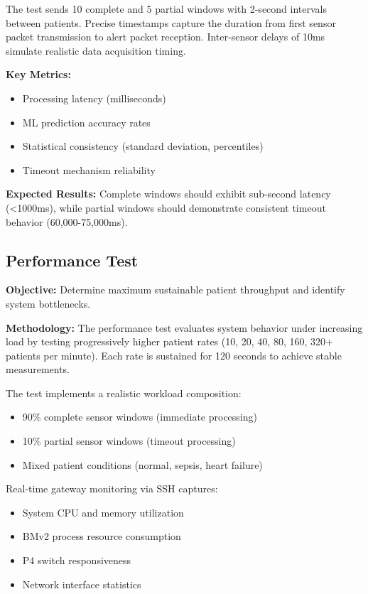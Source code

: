 The test sends 10 complete and 5 partial windows with 2-second intervals between patients. Precise timestamps capture the duration from first sensor packet transmission to alert packet reception. Inter-sensor delays of 10ms simulate realistic data acquisition timing.

\textbf{Key Metrics:}
\begin{itemize}
    \item Processing latency (milliseconds)
    \item ML prediction accuracy rates
    \item Statistical consistency (standard deviation, percentiles)
    \item Timeout mechanism reliability
\end{itemize}

\textbf{Expected Results:} Complete windows should exhibit sub-second latency (\textless 1000ms), while partial windows should demonstrate consistent timeout behavior (60,000-75,000ms).

\subsection{Performance Test}
\label{subsec:performance-test}

\textbf{Objective:} Determine maximum sustainable patient throughput and identify system bottlenecks.

\textbf{Methodology:} The performance test evaluates system behavior under increasing load by testing progressively higher patient rates (10, 20, 40, 80, 160, 320+ patients per minute). Each rate is sustained for 120 seconds to achieve stable measurements.

The test implements a realistic workload composition:
\begin{itemize}
    \item 90\% complete sensor windows (immediate processing)
    \item 10\% partial sensor windows (timeout processing)
    \item Mixed patient conditions (normal, sepsis, heart failure)
\end{itemize}

Real-time gateway monitoring via SSH captures:
\begin{itemize}
    \item System CPU and memory utilization
    \item BMv2 process resource consumption
    \item P4 switch responsiveness
    \item Network interface statistics
\end{itemize}

